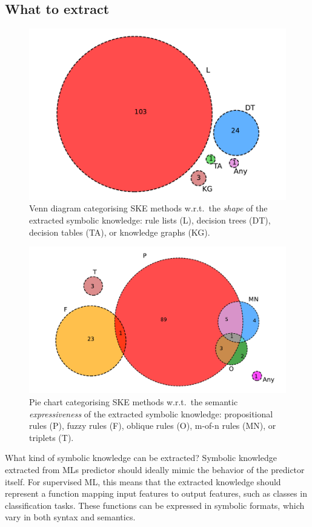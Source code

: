 \subsection{What to extract}\label{subsec:what-to-extract}
%
\begin{figure}
    \centering
    \includegraphics[width=.6\linewidth]{figures/ske-rule-shape}
    \caption[Venn diagram categorising SKE methods]{
        Venn diagram categorising \gls{SKE} methods w.r.t.\ the \emph{shape} of the extracted symbolic knowledge: rule lists (L), decision trees (DT), decision tables (TA), or knowledge graphs (KG).
    }
    \label{fig:pie-ski-shape}
\end{figure}
%
\begin{figure}
    \centering
    \includegraphics[width=.6\linewidth]{figures/ske-rule-format}
    \caption[Pie chart categorising SKE methods]{
        Pie chart categorising \gls{SKE} methods w.r.t.\ the semantic \emph{expressiveness} of the extracted symbolic knowledge: propositional rules (P), fuzzy rules (F), oblique rules (O), m-of-n rules (MN), or triplets (T).
    }
    \label{fig:pie-ski-expressiveness}
\end{figure}

What kind of symbolic knowledge can be extracted?
%
Symbolic knowledge extracted from \glspl{ML} predictor should ideally mimic the behavior of the predictor itself.
%
For supervised \gls{ML}, this means that the extracted knowledge should represent a function mapping input features to output features, such as classes in classification tasks.
%
These functions can be expressed in symbolic formats, which vary in both syntax and semantics.

